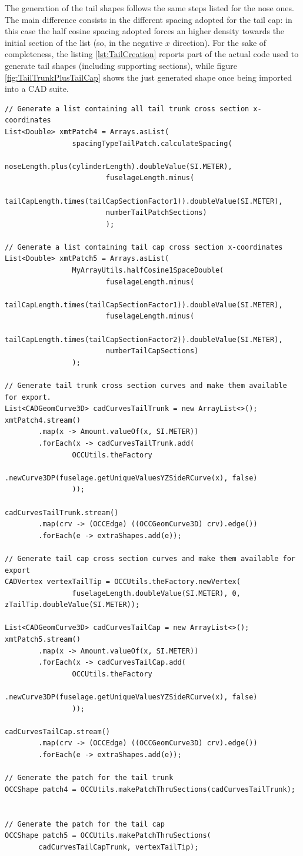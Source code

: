 \bigskip
\noindent
The generation of the tail shapes follows the same steps listed for the nose ones. The main difference consists in the different spacing adopted for the tail cap: in this case the half cosine spacing adopted forces an higher density towards the initial section of the list (so, in the negative $x$ direction). For the sake of completeness, the listing \ref{lst:TailCreation} reports part of the actual code used to generate tail shapes (including supporting sections), while figure \ref{fig:TailTrunkPlusTailCap} shows the just generated shape once being imported into a \gls{CAD} suite.
%
\bigskip
\begin{lstlisting}[caption={Tail trunk and cap building process}, captionpos=b, tabsize=2, label={lst:TailCreation}]
// Generate a list containing all tail trunk cross section x-coordinates
List<Double> xmtPatch4 = Arrays.asList(
				spacingTypeTailPatch.calculateSpacing(
						noseLength.plus(cylinderLength).doubleValue(SI.METER), 
						fuselageLength.minus(
								tailCapLength.times(tailCapSectionFactor1)).doubleValue(SI.METER), 
						numberTailPatchSections)
						);	

// Generate a list containing tail cap cross section x-coordinates				
List<Double> xmtPatch5 = Arrays.asList(
				MyArrayUtils.halfCosine1SpaceDouble(
						fuselageLength.minus(
								tailCapLength.times(tailCapSectionFactor1)).doubleValue(SI.METER), 
						fuselageLength.minus(
								tailCapLength.times(tailCapSectionFactor2)).doubleValue(SI.METER),
						numberTailCapSections) 
				);
		
// Generate tail trunk cross section curves and make them available for export.		
List<CADGeomCurve3D> cadCurvesTailTrunk = new ArrayList<>();
xmtPatch4.stream()
		.map(x -> Amount.valueOf(x, SI.METER))
		.forEach(x -> cadCurvesTailTrunk.add(
				OCCUtils.theFactory
						.newCurve3DP(fuselage.getUniqueValuesYZSideRCurve(x), false)
				));
						 
cadCurvesTailTrunk.stream()
		.map(crv -> (OCCEdge) ((OCCGeomCurve3D) crv).edge())
		.forEach(e -> extraShapes.add(e));	
		
// Generate tail cap cross section curves and make them available for export
CADVertex vertexTailTip = OCCUtils.theFactory.newVertex(
				fuselageLength.doubleValue(SI.METER), 0, zTailTip.doubleValue(SI.METER));
		
List<CADGeomCurve3D> cadCurvesTailCap = new ArrayList<>();
xmtPatch5.stream()
		.map(x -> Amount.valueOf(x, SI.METER))
		.forEach(x -> cadCurvesTailCap.add(
				OCCUtils.theFactory
						.newCurve3DP(fuselage.getUniqueValuesYZSideRCurve(x), false)
				));
						 
cadCurvesTailCap.stream()
		.map(crv -> (OCCEdge) ((OCCGeomCurve3D) crv).edge())
		.forEach(e -> extraShapes.add(e));	
		
// Generate the patch for the tail trunk
OCCShape patch4 = OCCUtils.makePatchThruSections(cadCurvesTailTrunk);


// Generate the patch for the tail cap
OCCShape patch5 = OCCUtils.makePatchThruSections(
		cadCurvesTailCapTrunk, vertexTailTip);
\end{lstlisting}
%

